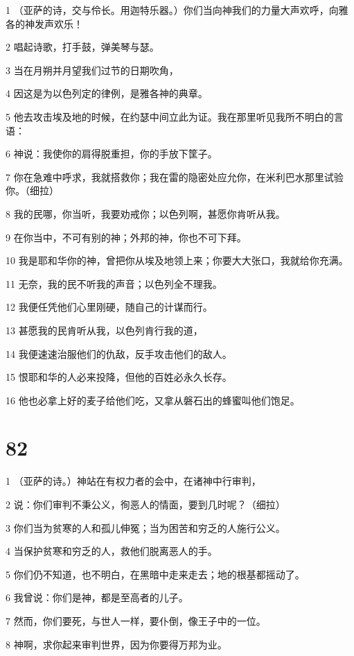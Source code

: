 \par 1 （亚萨的诗，交与伶长。用迦特乐器。）你们当向神我们的力量大声欢呼，向雅各的神发声欢乐！
\par 2 唱起诗歌，打手鼓，弹美琴与瑟。
\par 3 当在月朔并月望我们过节的日期吹角，
\par 4 因这是为以色列定的律例，是雅各神的典章。
\par 5 他去攻击埃及地的时候，在约瑟中间立此为证。我在那里听见我所不明白的言语：
\par 6 神说：我使你的肩得脱重担，你的手放下筐子。
\par 7 你在急难中呼求，我就搭救你；我在雷的隐密处应允你，在米利巴水那里试验你。（细拉）
\par 8 我的民哪，你当听，我要劝戒你；以色列啊，甚愿你肯听从我。
\par 9 在你当中，不可有别的神；外邦的神，你也不可下拜。
\par 10 我是耶和华你的神，曾把你从埃及地领上来；你要大大张口，我就给你充满。
\par 11 无奈，我的民不听我的声音；以色列全不理我。
\par 12 我便任凭他们心里刚硬，随自己的计谋而行。
\par 13 甚愿我的民肯听从我，以色列肯行我的道，
\par 14 我便速速治服他们的仇敌，反手攻击他们的敌人。
\par 15 恨耶和华的人必来投降，但他的百姓必永久长存。
\par 16 他也必拿上好的麦子给他们吃，又拿从磐石出的蜂蜜叫他们饱足。

\chapter{82}

\par 1 （亚萨的诗。）神站在有权力者的会中，在诸神中行审判，
\par 2 说：你们审判不秉公义，徇恶人的情面，要到几时呢？（细拉）
\par 3 你们当为贫寒的人和孤儿伸冤；当为困苦和穷乏的人施行公义。
\par 4 当保护贫寒和穷乏的人，救他们脱离恶人的手。
\par 5 你们仍不知道，也不明白，在黑暗中走来走去；地的根基都摇动了。
\par 6 我曾说：你们是神，都是至高者的儿子。
\par 7 然而，你们要死，与世人一样，要仆倒，像王子中的一位。
\par 8 神啊，求你起来审判世界，因为你要得万邦为业。

